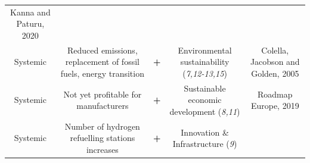 \documentclass[
]{book}
\begin{document}
\begin{longtable}[]{@{}ccccc@{}}
\begin{minipage}[t]{0.17\columnwidth}
Kanna and Paturu, 2020\strut
\end{minipage}\tabularnewline
\begin{minipage}[t]{0.17\columnwidth}\centering
Systemic\strut
\end{minipage} & \begin{minipage}[t]{0.16\columnwidth}\centering
Reduced emissions, replacement of fossil fuels, energy transition\strut
\end{minipage} & \begin{minipage}[t]{0.17\columnwidth}\centering
\textbf{+}\strut
\end{minipage} & \begin{minipage}[t]{0.17\columnwidth}\centering
Environmental sustainability (\emph{7,12-13,15})\strut
\end{minipage} & \begin{minipage}[t]{0.17\columnwidth}\centering
Colella, Jacobson and Golden, 2005\strut
\end{minipage}\tabularnewline
\begin{minipage}[t]{0.17\columnwidth}\centering
Systemic\strut
\end{minipage} & \begin{minipage}[t]{0.16\columnwidth}\centering
Not yet profitable for manufacturers\strut
\end{minipage} & \begin{minipage}[t]{0.17\columnwidth}\centering
\textbf{+}\strut
\end{minipage} & \begin{minipage}[t]{0.17\columnwidth}\centering
Sustainable economic development (\emph{8,11})\strut
\end{minipage} & \begin{minipage}[t]{0.17\columnwidth}\centering
Roadmap Europe, 2019\strut
\end{minipage}\tabularnewline
\begin{minipage}[t]{0.17\columnwidth}\centering
Systemic\strut
\end{minipage} & \begin{minipage}[t]{0.16\columnwidth}\centering
Number of hydrogen refuelling stations increases\strut
\end{minipage} & \begin{minipage}[t]{0.17\columnwidth}\centering
\textbf{+}\strut
\end{minipage} & \begin{minipage}[t]{0.17\columnwidth}\centering
Innovation \& Infrastructure (\emph{9})\strut
\end{minipage} & \begin{minipage}[t]{0.17\columnwidth}\centering

\end{minipage}
\end{longtable}
\end{document}
